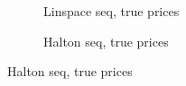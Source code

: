 \documentclass[a4paper,12pt]{article}
\begin{document}
\begin{figure} [H]
     \begin{subfigure}[b]{0.49\textwidth}
         \centering
    \caption{Linspace seq, true prices}
    \label{fig:linspace_true_prices}
     \end{subfigure}
     \hfill
     \begin{subfigure}[b]{0.49\textwidth}
         \centering
    \caption{Halton seq, true prices}
    \label{fig:halton_true_prices}
     \end{subfigure}
     \hfill
     

\end{figure}
\end{document}
